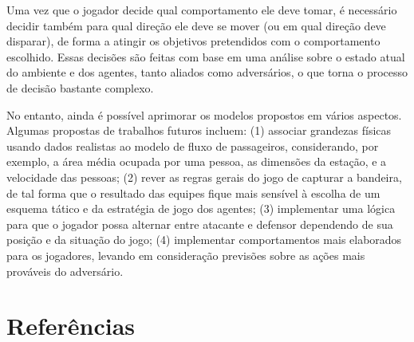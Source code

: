 \documentclass[preprint,12pt]{elsarticle}
\begin{document}
Uma vez que o jogador decide qual comportamento ele deve tomar, é necessário decidir também para qual direção ele deve se mover (ou em qual direção deve disparar), de forma a atingir os objetivos pretendidos com o comportamento escolhido. Essas decisões são feitas com base em uma análise sobre o estado atual do ambiente e dos agentes, tanto aliados como adversários, o que torna o processo de decisão bastante complexo.

No entanto, ainda é possível aprimorar os modelos propostos em vários aspectos. Algumas propostas de trabalhos futuros incluem: (1) associar grandezas físicas usando dados realistas ao modelo de fluxo de passageiros, considerando, por exemplo, a área média ocupada por uma pessoa, as dimensões da estação, e a velocidade das pessoas; (2) rever as regras gerais do jogo de capturar a bandeira, de tal forma que o resultado das equipes fique mais sensível à escolha de um esquema tático e da estratégia de jogo dos agentes; (3) implementar uma lógica para que o jogador possa alternar entre atacante e defensor dependendo de sua posição e da situação do jogo; (4) implementar comportamentos mais elaborados para os jogadores, levando em consideração previsões sobre as ações mais prováveis do adversário.

\section*{Referências}



\end{document}

